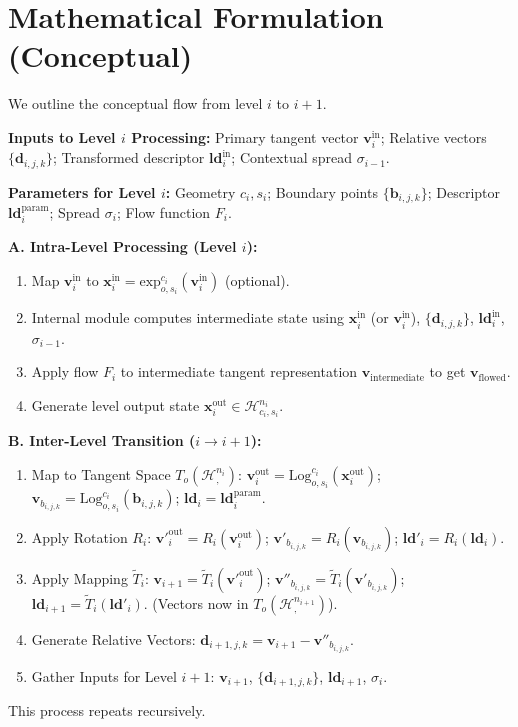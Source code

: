\documentclass[11pt, twoside]{article} %
\newcommand{\HypSpace}[3]{\mathcal{H}^{#1}_{#2, #3}} %
\begin{document}
\section{Mathematical Formulation (Conceptual)}
\label{sec:math_formulation}

We outline the conceptual flow from level $i$ to $i+1$.

\textbf{Inputs to Level $i$ Processing:} Primary tangent vector $\mathbf{v}_i^{\text{in}}$; Relative vectors $\{\mathbf{d}_{i, j, k}\}$; Transformed descriptor $\mathbf{ld}_i^{\text{in}}$; Contextual spread $\sigma_{i-1}$.

\textbf{Parameters for Level $i$:} Geometry $c_i, s_i$; Boundary points $\{\mathbf{b}_{i,j,k}\}$; Descriptor $\mathbf{ld}_i^{\text{param}}$; Spread $\sigma_i$; Flow function $F_i$.

\textbf{A. Intra-Level Processing (Level $i$):}
\begin{enumerate}
    \item Map $\mathbf{v}_i^{\text{in}}$ to $\mathbf{x}_i^{\text{in}} = \text{exp}_{o,s_i}^{c_i}(\mathbf{v}_i^{\text{in}})$ (optional).
    \item Internal module computes intermediate state using $\mathbf{x}_i^{\text{in}}$ (or $\mathbf{v}_i^{\text{in}}$), $\{\mathbf{d}_{i, j, k}\}$, $\mathbf{ld}_i^{\text{in}}$, $\sigma_{i-1}$.
    \item Apply flow $F_i$ to intermediate tangent representation $\mathbf{v}_{\text{intermediate}}$ to get $\mathbf{v}_{\text{flowed}}$.
    \item Generate level output state $\mathbf{x}_i^{\text{out}} \in \HypSpace{n_i}{c_i}{s_i}$.
\end{enumerate}

\textbf{B. Inter-Level Transition ($i \rightarrow i+1$):}
\begin{enumerate}
    \item Map to Tangent Space $T_o(\HypSpace{n_i}{}{})$:
        $\mathbf{v}_i^{\text{out}} = \text{Log}_{o,s_i}^{c_i}(\mathbf{x}_i^{\text{out}})$;
        $\mathbf{v}_{b_{i,j,k}} = \text{Log}_{o,s_i}^{c_i}(\mathbf{b}_{i,j,k})$;
        $\mathbf{ld}_i = \mathbf{ld}_i^{\text{param}}$.
    \item Apply Rotation $R_i$:
        $\mathbf{v}'^{\text{out}}_i = R_i(\mathbf{v}_i^{\text{out}})$;
        $\mathbf{v}'_{b_{i,j,k}} = R_i(\mathbf{v}_{b_{i,j,k}})$;
        $\mathbf{ld}'_i = R_i(\mathbf{ld}_i)$.
    \item Apply Mapping $\tilde{T}_i$:
        $\mathbf{v}_{i+1} = \tilde{T}_i(\mathbf{v}'^{\text{out}}_i)$;
        $\mathbf{v}''_{b_{i,j,k}} = \tilde{T}_i(\mathbf{v}'_{b_{i,j,k}})$;
        $\mathbf{ld}_{i+1} = \tilde{T}_i(\mathbf{ld}'_i)$. (Vectors now in $T_o(\HypSpace{n_{i+1}}{}{})$).
    \item Generate Relative Vectors: $\mathbf{d}_{i+1, j, k} = \mathbf{v}_{i+1} - \mathbf{v}''_{b_{i,j,k}}$.
    \item Gather Inputs for Level $i+1$: $\mathbf{v}_{i+1}$, $\{\mathbf{d}_{i+1, j, k}\}$, $\mathbf{ld}_{i+1}$, $\sigma_i$.
\end{enumerate}
This process repeats recursively.
\end{document}
